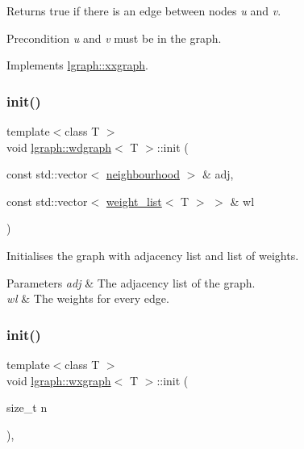 Returns true if there is an edge between nodes {\itshape u} and {\itshape v}. 

\begin{DoxyPrecond}{Precondition}
{\itshape u} and {\itshape v} must be in the graph. 
\end{DoxyPrecond}


Implements \hyperlink{classlgraph_1_1xxgraph_a4e36e9722df020df6ba1dc47b7d9d830}{lgraph\+::xxgraph}.

\mbox{\label{classlgraph_1_1wdgraph_a0c3bbc5f54169acb294c636836c83047}} 
\subsubsection{\texorpdfstring{init()}{init()}\hspace{0.1cm}{\footnotesize\ttfamily [1/3]}}
{\footnotesize\ttfamily template$<$class T $>$ \\
void \hyperlink{classlgraph_1_1wdgraph}{lgraph\+::wdgraph}$<$ T $>$\+::init (\begin{DoxyParamCaption}\item[{const std\+::vector$<$ \hyperlink{namespacelgraph_a052e7766c13f3a43cec0aec8173fdede}{neighbourhood} $>$ \&}]{adj,  }\item[{const std\+::vector$<$ \hyperlink{namespacelgraph_a1e0fd5ef0a78b2a92da48adbed265cb6}{weight\+\_\+list}$<$ T $>$ $>$ \&}]{wl }\end{DoxyParamCaption})}



Initialises the graph with adjacency list and list of weights. 


\begin{DoxyParams}{Parameters}
{\em adj} & The adjacency list of the graph. \\
\hline
{\em wl} & The weights for every edge. \\
\hline
\end{DoxyParams}
\mbox{\label{classlgraph_1_1wxgraph_aa09f37bf4a34a0f4f002587203df0125}} 
\subsubsection{\texorpdfstring{init()}{init()}\hspace{0.1cm}{\footnotesize\ttfamily [2/3]}}
{\footnotesize\ttfamily template$<$class T $>$ \\
void \hyperlink{classlgraph_1_1wxgraph}{lgraph\+::wxgraph}$<$ T $>$\+::init (\begin{DoxyParamCaption}\item[{size\+\_\+t}]{n }\end{DoxyParamCaption})\hspace{0.3cm}{\ttfamily [virtual]}, {\ttfamily [inherited]}}



